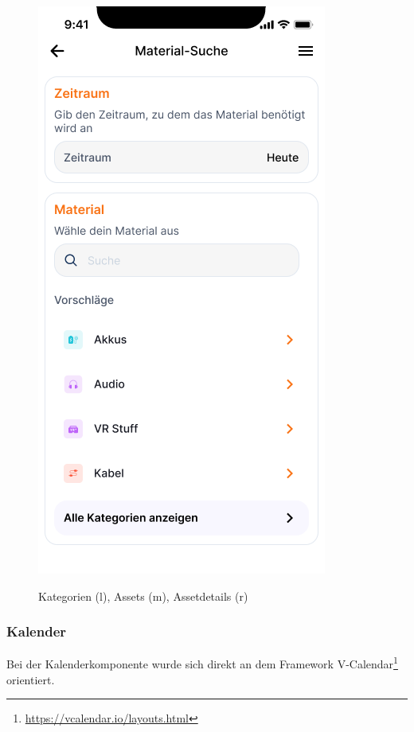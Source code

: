 \begin{figure}[h]
    \includegraphics[scale=0.3]{Bilder/Prototyp/Suche.png}
    \label{fig:p1}
    \caption[Mockup: Kategorien, Assets, Assetdetails]{Kategorien (l), Assets (m), Assetdetails (r)}
\end{figure}


\subsubsection{Kalender}
Bei der Kalenderkomponente wurde sich direkt an dem Framework
V-Calendar\footnote{\url{https://vcalendar.io/layouts.html}} orientiert.


